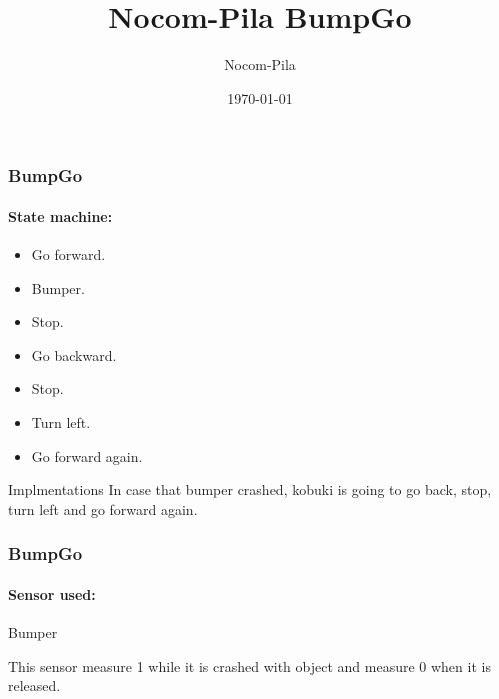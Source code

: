 \documentclass{beamer}
\title[BumpGo]{Nocom-Pila BumpGo} %
\author{Nocom-Pila} %
\institute[URJC] %
{
Universidad Rey Juan Carlos  \\ %
\medskip
\textit{nocompila@gmail.com} %
}
\date{\today} %
\begin{document}

\begin{frame}
\titlepage %
\end{frame}
\begin{frame}


\frametitle{BumpGo} %
\framesubtitle{State machine:}
\begin{itemize}
	\item Go forward. \\ \item Bumper.\\ \item Stop.
	\item Go backward. \\ \item Stop.\\ \item Turn left.\\ \item Go forward again.
	
\end{itemize}

\end{frame}
\begin{frame}
\begin{block}{Implmentations}
		In case that bumper crashed, kobuki is going to go back, stop, turn left and go 			forward again.
\end{block}
\end{frame}

\begin{frame}
\frametitle{BumpGo} 
\framesubtitle{Sensor used:}
\begin{block}{Bumper}
	
	This sensor measure 1 while it is crashed with object and measure 0 when it is 			    released.
	
\end{block}

\end{frame}
\end{document}
